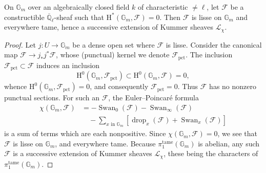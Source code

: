 On \(\mathbb{G}_m\) over an algebraically closed field \(k\) of characteristic
\(\ne\ell\), let \(\mathcal{F}\) be a constructible
\(\overline{\mathbb{Q}}_\ell\)-sheaf such that
\(\mathrm{H}^*(\mathbb{G}_m,\mathcal{F})=0\). Then \(\mathcal{F}\) is lisse on
\(\mathbb{G}_m\) and everywhere tame, hence a successive extension of Kummer
sheaves \(\mathcal{L}_\chi\).
\begin{proof}
Let \(j:U\to\mathbb{G}_m\) be a dense open set where \(\mathcal{F}\) is lisse.
Consider the canonical map \(\mathcal{F}\to j_*j^*\mathcal{F}\), whose
(punctual) kernel we denote \(\mathcal{F}_{\mathrm{pct}}\). The inclusion
\(\mathcal{F}_{\mathrm{pct}}\subset\mathcal{F}\) induces an inclusion
\[
  \mathrm{H}^0(\mathbb{G}_m,\mathcal{F}_{\mathrm{pct}})
  \subset \mathrm{H}^0(\mathbb{G}_m,\mathcal{F})=0,
\]
whence \(\mathrm{H}^0(\mathbb{G}_m,\mathcal{F}_{\mathrm{pct}})=0\), and
consequently \(\mathcal{F}_{\mathrm{pct}}=0\). Thus \(\mathcal{F}\) has no
nonzero punctual sections. For such an \(\mathcal{F}\), the Euler--Poincaré
formula
\[
\begin{aligned}
  \chi(\mathbb{G}_m,\mathcal{F})
  &=-\operatorname{Swan}_0(\mathcal{F})
    -\operatorname{Swan}_{\infty}(\mathcal{F})\\
  &\quad-\sum_{x\text{ in }\mathbb{G}_m}
    [\operatorname{drop}_x(\mathcal{F})
    +\operatorname{Swan}_x(\mathcal{F})]
\end{aligned}
\]
is a sum of terms which are each nonpositive. Since
\(\chi(\mathbb{G}_m,\mathcal{F})=0\), we see that \(\mathcal{F}\) is lisse on
\(\mathbb{G}_m\), and everywhere tame. Because
\(\pi_1^{\mathrm{tame}}(\mathbb{G}_m)\) is abelian, any such \(\mathcal{F}\)
is a successive extension of Kummer sheaves \(\mathcal{L}_\chi\), these being
the characters of \(\pi_1^{\mathrm{tame}}(\mathbb{G}_m)\).
\end{proof}

